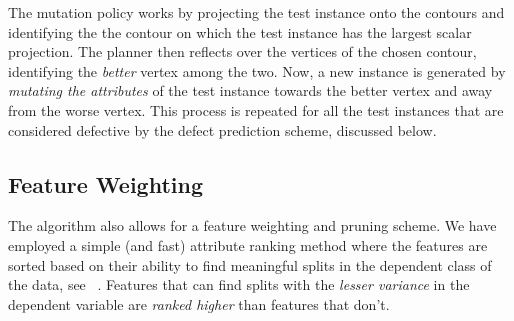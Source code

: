 \documentclass[conference]{IEEEtran}
\begin{document}
The mutation policy works by projecting the test instance onto the contours and identifying the the contour on which the test instance has the largest scalar projection. The planner then reflects over the vertices of the chosen contour, identifying the \textit{better} vertex among the two. Now, a new instance is generated by \textit{mutating the attributes} of the test instance towards the better vertex and away from the worse vertex. This process is repeated for all the test instances that are considered defective by the defect prediction scheme, discussed below.

\subsection{Feature Weighting} \label{fwt}
The algorithm also allows for a feature weighting and pruning scheme. We have employed a simple (and fast) attribute ranking method where the features are sorted based on their ability to find meaningful splits in the dependent class of the data, see ~\cite{hall03}. Features that can find splits with the \textit{lesser variance} in the dependent variable are \textit{ranked higher} than features that don't. 
\end{document}

